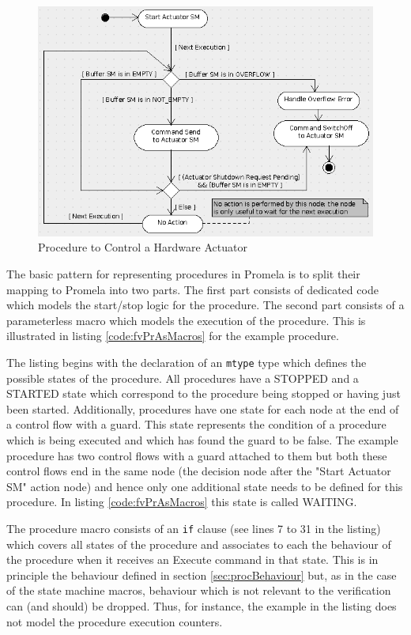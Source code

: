 \documentclass[a4paper,10pt]{article}
\begin{document}
\begin{figure}[ht]
 \centering
 \includegraphics[scale=0.45,keepaspectratio=true]{../images/FV_ActuatorController.png}
 \caption{Procedure to Control a Hardware Actuator}
 \label{fig:FV_ActuatorController}
\end{figure}

The basic pattern for representing procedures in Promela is to split their mapping to Promela into two parts. The first part consists of dedicated code which models the start/stop logic for the procedure. The second part consists of a parameterless macro which models the execution of the procedure. This is illustrated in listing \ref{code:fvPrAsMacros} for the example procedure. 

The listing begins with the declaration of an \texttt{mtype} type which defines the possible states of the procedure. All procedures have a STOPPED and a STARTED state which correspond to the procedure being stopped or having just been started. Additionally, procedures have one state for each node at the end of a control flow with a guard. This state represents the condition of a procedure which is being executed and which has found the guard to be false. The example procedure has two control flows with a guard attached to them but both these control flows end in the same node (the decision node after the "Start Actuator SM" action node) and hence only one additional state needs to be defined for this procedure. In listing \ref{code:fvPrAsMacros} this state is called WAITING. 

The procedure macro consists of an \texttt{if} clause (see lines 7 to 31 in the listing) which covers all states of the procedure and associates to each the behaviour of the procedure when it receives an Execute command in that state. This is in principle the behaviour defined in section \ref{sec:procBehaviour} but, as in the case of the state machine macros, behaviour which is not relevant to the verification can (and should) be dropped. Thus, for instance, the example in the listing does not model the procedure execution counters.
\end{document}
